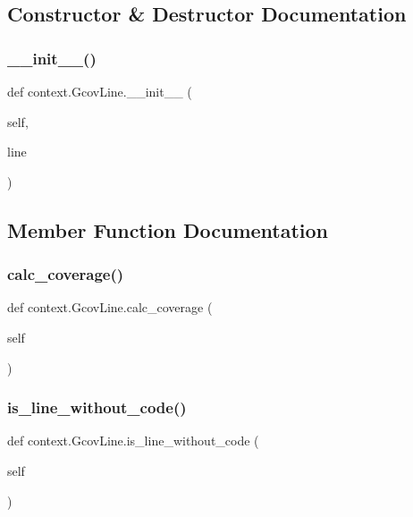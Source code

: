 \subsection{Constructor \& Destructor Documentation}
\mbox{\label{classcontext_1_1GcovLine_a055cc92ff557db5eaea188e2d022e24d}} 
\subsubsection{\texorpdfstring{\_\_init\_\_()}{\_\_init\_\_()}}
{\footnotesize\ttfamily def context.\+Gcov\+Line.\+\_\+\+\_\+init\+\_\+\+\_\+ (\begin{DoxyParamCaption}\item[{}]{self,  }\item[{}]{line }\end{DoxyParamCaption})}



\subsection{Member Function Documentation}
\mbox{\label{classcontext_1_1GcovLine_af75d38292cba95dc97c72bcd788ddb5d}} 
\subsubsection{\texorpdfstring{calc\_coverage()}{calc\_coverage()}}
{\footnotesize\ttfamily def context.\+Gcov\+Line.\+calc\+\_\+coverage (\begin{DoxyParamCaption}\item[{}]{self }\end{DoxyParamCaption})}

\mbox{\label{classcontext_1_1GcovLine_aa6a99fe28aad4ef23fc2809b6a392d37}} 
\subsubsection{\texorpdfstring{is\_line\_without\_code()}{is\_line\_without\_code()}}
{\footnotesize\ttfamily def context.\+Gcov\+Line.\+is\+\_\+line\+\_\+without\+\_\+code (\begin{DoxyParamCaption}\item[{}]{self }\end{DoxyParamCaption})}

